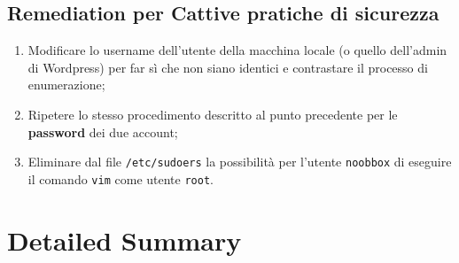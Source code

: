 \documentclass[a4paper, 12pt, oneside]{article}
\begin{document}
\newpage
\subsection{Remediation per \textbf{Cattive pratiche di sicurezza}}
\begin{enumerate}
    \item Modificare lo username dell'utente della macchina locale (o quello dell'admin di Wordpress) per far sì che non siano identici e contrastare il processo di enumerazione;
    \item Ripetere lo stesso procedimento descritto al punto precedente per le \textbf{password} dei due account;
    \item Eliminare dal file \texttt{/etc/sudoers} la possibilità per l'utente \texttt{noobbox} di eseguire il comando \texttt{vim} come utente \texttt{root}.
\end{enumerate}
\newpage

\section{Detailed Summary}
\newpage

\printbibliography[title={Riferimenti bibliografici}]
\end{document}
